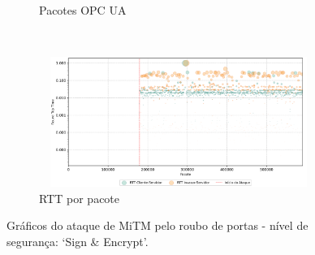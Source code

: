 \begin{apendicesenv}
\begin{figure}[htbp!]
\begin{subfigure}[t]{0.5\textwidth}
        \caption{Pacotes OPC UA}
    \end{subfigure}%
    ~
    \begin{subfigure}[t]{0.5\textwidth}
        \centering
        \includegraphics[width=1\textwidth, height=120pt]{USPSC-img/output/cropped/2-mitm_port-rttp.png}
        \caption{RTT por pacote}
    \end{subfigure}%
    \label{fig:2-mitm_port}
    \caption{Gráficos do ataque de MiTM pelo roubo de portas - nível de segurança: `Sign \& Encrypt'.}
\end{figure}

\end{apendicesenv}
